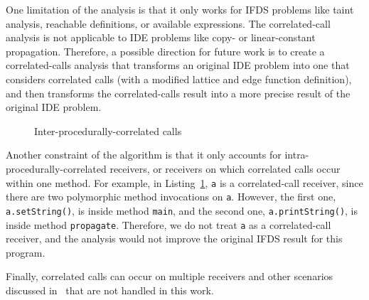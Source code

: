 One limitation of the analysis is that it only works for IFDS problems like taint analysis, reachable definitions, or available expressions. The correlated-call analysis is not applicable to IDE problems like copy- or linear-constant propagation. Therefore, a possible direction for future work is to create a correlated-calls analysis that transforms an original IDE problem into one that considers correlated calls (with a modified lattice and edge function definition), and then transforms the correlated-calls result into a more precise result of the original IDE problem.

\begin{figure}
  \centering
  \begin{minipage}{\textwidth}
  \end{minipage}
  \caption{Inter-procedurally-correlated calls}
  \label{list:interProcRec}
\end{figure}

Another constraint of the algorithm is that it only accounts for intra-procedurally-correlated receivers, or receivers on which correlated calls occur within one method. For example, in Listing~\ref{list:interProcRec}, \verb'a' is a correlated-call receiver, since there are two polymorphic method invocations on \verb'a'. However, the first one, \verb'a.setString()', is inside method \verb'main', and the second one, \verb'a.printString()', is inside method \verb'propagate'. Therefore, we do not treat \verb'a' as a correlated-call receiver, and the analysis would not improve the original IFDS result for this program.

Finally, correlated calls can occur on multiple receivers and other scenarios discussed in~\cite{DBLP:journals/scp/Tip15} that are not handled in this work.
